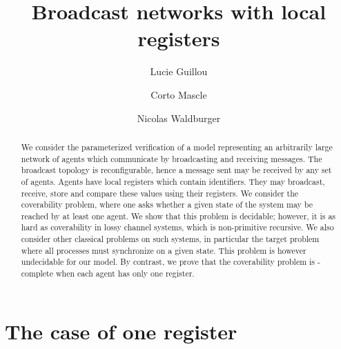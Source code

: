 \documentclass[a4paper,UKenglish,cleveref, autoref, thm-restate]{lipics-v2021}
\title{Broadcast networks with local registers}
\author{Lucie Guillou}{IRIF, Université de Paris}{}{}{}
\author{Corto Mascle}{LaBRI, Université de Bordeaux}{}{}{}
\author{Nicolas Waldburger}{IRISA, Universit\'e de Rennes}{}{}{}
\begin{document}
	
	\maketitle
	
	\begin{abstract}
		We consider the parameterized verification of a model representing an arbitrarily large network of agents which communicate by broadcasting and receiving messages. The broadcast topology is reconfigurable, hence a message sent may be received by any set of agents.
		Agents have local registers which contain identifiers. They may broadcast, receive, store and compare these values using their registers.
		We consider the coverability problem, where one asks whether a given state of the system may be reached by at least one agent. We show that this problem is decidable; however, it is as hard as coverability in lossy channel systems, which is non-primitive recursive. 
		We also consider other classical problems on such systems, in particular the target problem where all processes must synchronize on a given state. This problem is however undecidable for our model. 
		By contrast, we prove that the coverability problem is \NP-complete when each agent has only one register.
		
	\end{abstract}
	
	
	
	
	
	
	
	\section{The case of one register}
	
	
	
	
	
	
	\newpage
	
	\appendix
	
	
\end{document}
